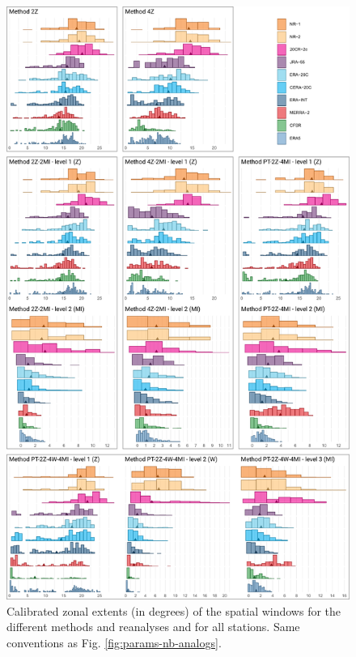 \documentclass[alpha-refs]{wiley-article}
\begin{document}
\begin{figure}[btp]
	\centering
	\includegraphics[width=115mm]{figure-7.pdf}
	\caption{Calibrated zonal extents (in degrees) of the spatial windows for the different methods and reanalyses and for all stations. Same conventions as Fig. \protect\ref{fig:params-nb-analogs}.}
	\label{fig:params-xwidth}
\end{figure}
\end{document}
